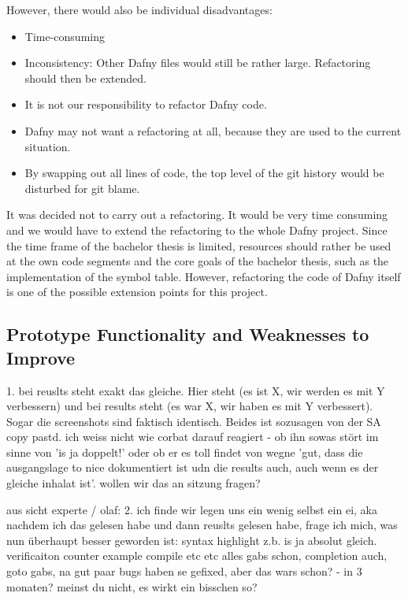 However, there would also be individual disadvantages:
\begin{itemize}
    \item Time-consuming
    \item Inconsistency: Other Dafny files would still be rather large. Refactoring should then be extended.
    \item It is not our responsibility to refactor Dafny code.
    \item Dafny may not want a refactoring at all, because they are used to the current situation.
    \item By swapping out all lines of code, the top level of the git history would be disturbed for git blame.
\end{itemize}

It was decided not to carry out a refactoring.
It would be very time consuming and we would have to extend the refactoring to the whole Dafny project.
Since the time frame of the bachelor thesis is limited, resources should rather be used at the own code segments and the core goals of the bachelor thesis, such as the implementation of the symbol table.
However, refactoring the code of Dafny itself is one of the possible extension points for this project.



\subsection{Prototype Functionality and Weaknesses to Improve}
\label{section:analysis:features}

1. bei reuslts steht exakt das gleiche. Hier steht (es ist X, wir werden es mit Y verbessern) und bei results steht (es war X, wir haben es mit Y verbessert). Sogar die screenshots sind faktisch identisch. Beides ist sozusagen von der SA copy pastd.
ich weiss nicht wie corbat darauf reagiert - ob ihn sowas stört im sinne von 'is ja doppelt!' oder ob er es toll findet von wegne 'gut, dass die ausgangslage to nice dokumentiert ist udn die results auch, auch wenn es der gleiche inhalat ist'.
wollen wir das an sitzung fragen?

aus sicht experte / olaf:
2. ich finde wir legen uns ein wenig selbst ein ei, aka nachdem ich das gelesen habe und dann reuslts gelesen habe, frage ich mich, was nun überhaupt besser geworden ist: syntax highlight z.b. is ja absolut gleich. verificaiton counter example compile etc etc alles gabs schon, completion auch, goto gabs, na gut paar bugs haben se gefixed, aber das wars schon? - in 3 monaten?
meinst du nicht, es wirkt ein bisschen so?

